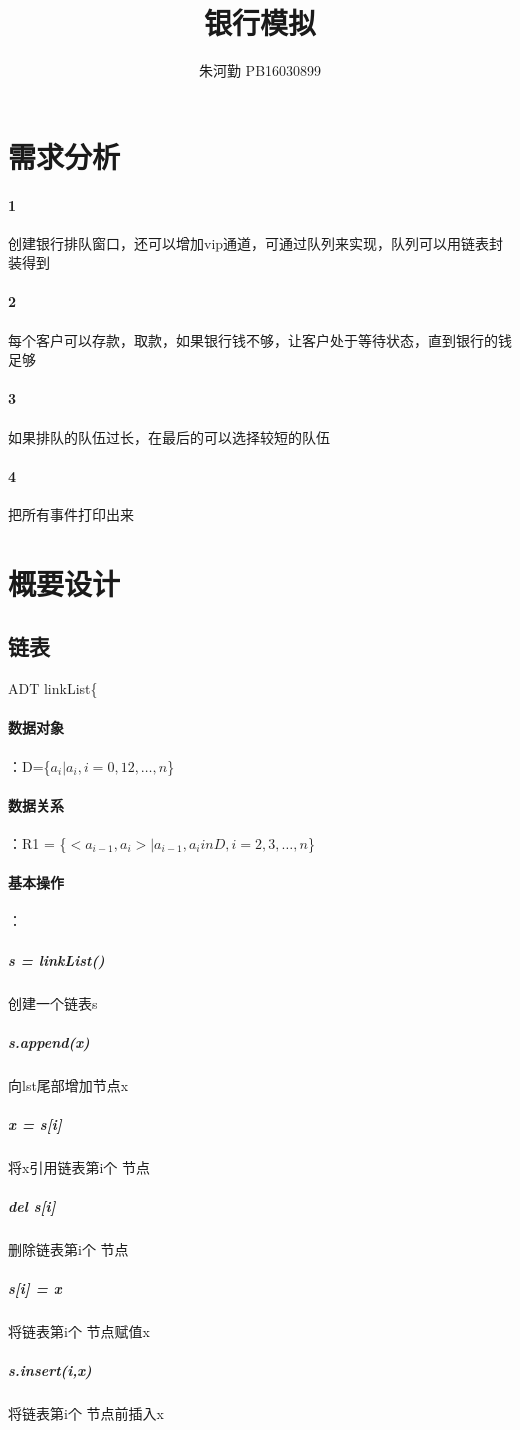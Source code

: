 \documentclass[UTF8]{ctexart}
\title{银行模拟}
\author{朱河勤   PB16030899}
\begin{document}
\maketitle
\tableofcontents
\section{需求分析}
\paragraph{1}
创建银行排队窗口，还可以增加vip通道，可通过队列来实现，队列可以用链表封装得到
\paragraph{2}
每个客户可以存款，取款，如果银行钱不够，让客户处于等待状态，直到银行的钱足够
\paragraph{3}
如果排队的队伍过长，在最后的可以选择较短的队伍
\paragraph{4}
把所有事件打印出来
\section{概要设计}
\subsection{链表}
ADT linkList\{\\
\paragraph{数据对象}：D=\{$a_i| a_i , i =0,1 2,\dots,n$\}\\
\paragraph{数据关系}：R1 = \{$<a_{i-1},a_i> | a_{i-1},a_i in D ,i = 2,3,\dots,n$\}\\
\paragraph{基本操作}：
\subparagraph{s = linkList()}创建一个链表s
\subparagraph{s.append(x)} 向lst尾部增加节点x
\subparagraph{x = s[i]}将x引用链表第i个 节点
\subparagraph{del s[i]}删除链表第i个 节点
\subparagraph{s[i] = x}将链表第i个 节点赋值x
\subparagraph{s.insert(i,x)}将链表第i个 节点前插入x
\end{document}
